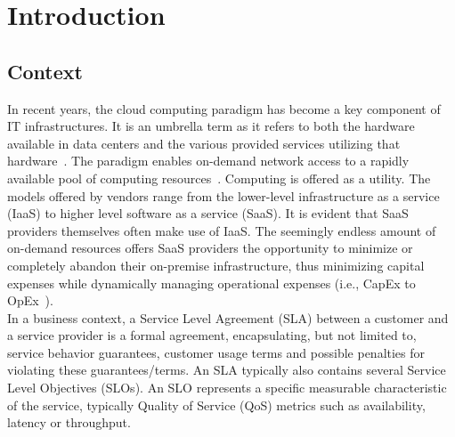 \chapter{Introduction}






\section{Context}

In recent years, the cloud computing paradigm has become a key component of IT infrastructures. It is an umbrella term as it refers to both the hardware available in data centers and the various provided services utilizing that hardware~\cite{armbrust2010view}.  The paradigm enables on-demand network access to a rapidly available pool of computing resources~\cite{mell2011nist}. Computing is offered as a utility. The models offered by vendors range from the lower-level infrastructure as a service (IaaS) to higher level software as a service (SaaS). It is evident that SaaS providers themselves often make use of IaaS. The seemingly endless amount of on-demand resources offers SaaS providers the opportunity to minimize or completely abandon their on-premise infrastructure, thus minimizing capital expenses while dynamically managing operational expenses (i.e., CapEx to OpEx~\cite{armbrust2010view}). \\

\noindent In a business context, a Service Level Agreement (SLA) between a customer and a service provider is a formal agreement, encapsulating, but not limited to, service behavior guarantees, customer usage terms and possible penalties for violating these guarantees/terms. An SLA typically also contains several Service Level Objectives (SLOs). An SLO represents a specific measurable characteristic of the service, typically Quality of Service (QoS) metrics such as availability, latency or throughput.\\

